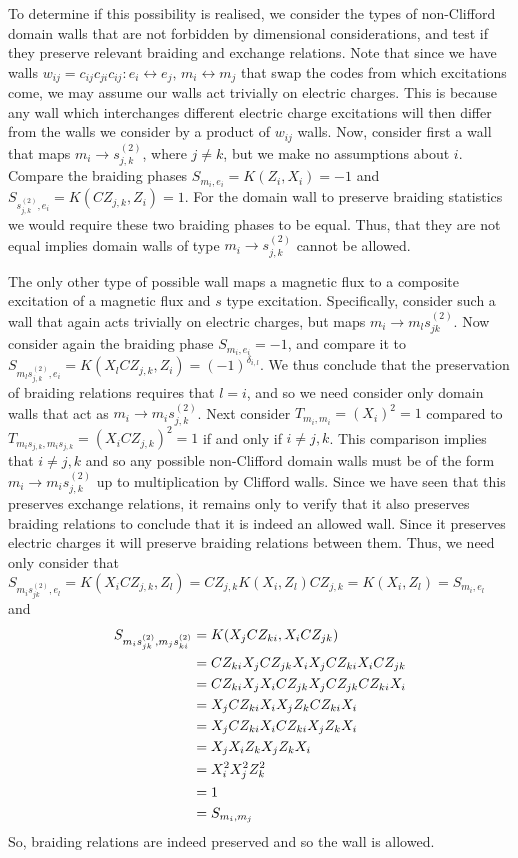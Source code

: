 \documentclass[pra,twocolumn,a4paper,nofootinbib]{revtex4-1}
\begin{document}
To determine if this possibility is realised, we consider the types of non-Clifford domain walls that are not forbidden by dimensional considerations, and test if they preserve relevant braiding and exchange relations. Note that since we have walls $w_{ij}=c_{ij}c_{ji}c_{ij}: e_i \leftrightarrow e_j,\, m_i \leftrightarrow m_j$ that swap the codes from which excitations come, we may assume our walls act trivially on electric charges. This is because any wall which interchanges different electric charge excitations will then differ from the walls we consider by a product of $w_{ij}$ walls.  Now, consider first a wall that maps $m_i \to s^{(2)}_{j,k}$, where $j \neq k$, but we make no assumptions about $i$. Compare the braiding phases $S_{m_i,e_i}=K(Z_i,X_i)=-1$ and $S_{s^{(2)}_{j,k},e_i}=K(CZ_{j,k},Z_i)=1$. For the domain wall to preserve braiding statistics we would require these two braiding phases to be equal. Thus, that they are not equal implies domain walls of type $m_i \to s^{(2)}_{j,k}$ cannot be allowed.

The only other type of possible wall maps a magnetic flux to a composite excitation of a magnetic flux and $s$ type excitation. Specifically, consider such a wall that again acts trivially on electric charges, but maps $m_{i} \to m_l s^{(2)}_{jk}$. Now consider again the braiding phase $S_{m_i, e_i}=-1$, and compare it to $S_{m_l s^{(2)}_{j,k}, e_i}= K(X_l CZ_{j,k}, Z_i)=(-1)^{\delta_{i,l}}$. We thus conclude that the preservation of braiding relations requires that $l=i$, and so we need consider only domain walls that act as $m_i \to m_i s^{(2)}_{j,k}$. Next consider $T_{m_i,m_i}= (X_i)^2=1$ compared to $T_{m_is_{j,k},m_is_{j,k}}= (X_iCZ_{j,k})^2=1$ if and only if $i \neq j,k$. This comparison implies that $i \neq j,k$ and so any possible non-Clifford domain walls must be of the form $m_i \to m_i s^{(2)}_{j,k}$ up to multiplication by Clifford walls. Since we have seen that this preserves exchange relations, it remains only to verify that it also preserves braiding relations to conclude that it is indeed an allowed wall. Since it preserves electric charges it will preserve braiding relations between them. Thus, we need only consider that $S_{m_is^{(2)}_{jk},e_l}=K(X_i CZ_{j,k}, Z_l)= CZ_{j,k} K(X_i, Z_l)CZ_{j,k}=K(X_i,Z_l)=S_{m_i,e_l}$ and 
\begin{align}
S_{m_{i}s^{(2)}_{jk},m_{j}s^{(2)}_{ki}} &= K(X_j CZ_{ki}, X_i CZ_{jk}) \notag\\
&= CZ_{ki}X_j CZ_{jk}X_i X_j CZ_{ki} X_i CZ_{jk} \notag\\
&= CZ_{ki}X_j X_i CZ_{jk}X_j CZ_{jk} CZ_{ki}X_i \notag\\
&= X_j CZ_{ki} X_i X_j Z_k CZ_{ki} X_i \notag\\
&= X_j CZ_{ki}X_i CZ_{ki} X_j Z_k X_i \notag \\
&= X_j X_iZ_k X_jZ_kX_i \notag \\
&=X_i^2X_j^2Z_k^2\notag \\
&=1\notag \\
&= S_{m_{i},m_j}
\end{align}
So, braiding relations are indeed preserved and so the wall is allowed.
\end{document}
